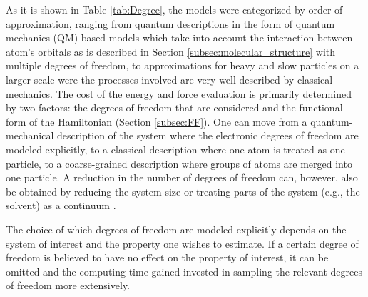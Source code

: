 As it is shown in Table \ref{tab:Degree}, the models were categorized by order of approximation, ranging from quantum descriptions in the form of quantum mechanics (QM) based models which take into account the interaction between atom's orbitals as is described in Section \ref{subsec:molecular_structure} with multiple degrees of freedom, to approximations for heavy and slow particles on a larger scale were the processes involved are very well described by classical mechanics. The cost of the energy and force evaluation is primarily determined by two factors: the degrees of freedom that are considered and the functional form of the Hamiltonian (Section \ref{subsec:FF}). One can move from a quantum-mechanical description of the system where the electronic degrees of freedom are modeled explicitly, to a classical description where one atom is treated as one particle, to a coarse-grained description where groups of atoms are merged into one particle. A reduction in the number of degrees of freedom can, however, also be obtained by reducing the system size or treating parts of the system (e.g., the solvent) as a continuum \cite{christ2010basic}.

The choice of which degrees of freedom are modeled explicitly depends on the system of interest and the property one wishes to estimate. If a certain degree of freedom is believed to have no effect on the property of interest, it can be omitted and the computing time gained invested in sampling the relevant degrees of freedom more extensively.